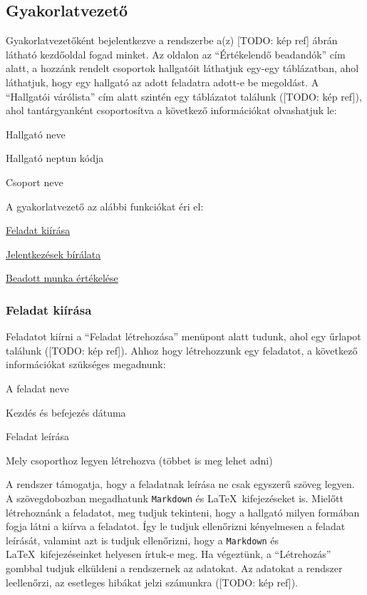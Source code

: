 \subsection{Gyakorlatvezető}\label{step:instructor-role}
Gyakorlatvezetőként bejelentkezve a rendszerbe a(z) [TODO: kép ref] ábrán látható kezdőoldal fogad minket. Az oldalon az ``Értékelendő beadandók'' cím alatt, a hozzánk rendelt csoportok hallgatóit láthatjuk egy-egy táblázatban, ahol láthatjuk, hogy egy hallgató az adott feladatra adott-e be megoldást. A ``Hallgatói várólista'' cím alatt szintén egy táblázatot találunk ([TODO: kép ref]), ahol tantárgyanként csoportosítva a következő információkat olvashatjuk le:
\begin{compactitem}
    \item Hallgató neve
	\item Hallgató neptun kódja
	\item Csoport neve
\end{compactitem}
A gyakorlatvezető az alábbi funkciókat éri el:
\begin{compactitem}
    \item \hyperref[step:instructor-create-assignment]{Feladat kiírása}
	\item \hyperref[step:instructor-pending]{Jelentkezések bírálata}
	\item \hyperref[step:instructor-eval]{Beadott munka értékelése}
\end{compactitem}
\subsubsection{Feladat kiírása}
\label{step:instructor-create-assignment}
Feladatot kiírni a ``Feladat létrehozása'' menüpont alatt tudunk, ahol egy űrlapot találunk ([TODO: kép ref]). Ahhoz hogy létrehozzunk egy feladatot, a következő információkat szükséges megadnunk:
\begin{compactitem}
    \item A feladat neve
    \item Kezdés és befejezés dátuma
	\item Feladat leírása
	\item Mely csoporthoz legyen létrehozva (többet is meg lehet adni)
\end{compactitem}
A rendszer támogatja, hogy a feladatnak leírása ne csak egyszerű szöveg legyen. A szövegdobozban megadhatunk \texttt{Markdown} és \LaTeX\ kifejezéseket is. Mielőtt létrehoznánk a feladatot, meg tudjuk tekinteni, hogy a hallgató milyen formában fogja látni a kiírva a feladatot. Így le tudjuk ellenőrizni kényelmesen a feladat leírását, valamint azt is tudjuk ellenőrizni, hogy a \texttt{Markdown} és \LaTeX\ kifejezéseinket helyesen írtuk-e meg. Ha végeztünk, a ``Létrehozás'' gombbal tudjuk elküldeni a rendszernek az adatokat. Az adatokat a rendszer leellenőrzi, az esetleges hibákat jelzi számunkra ([TODO: kép ref]).
